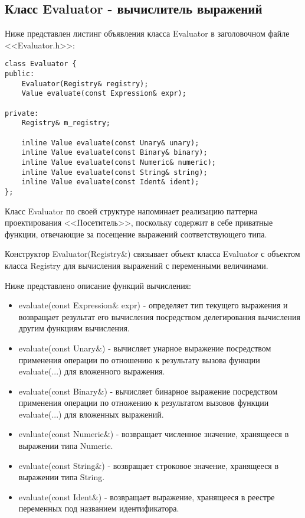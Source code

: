 \subsection{Класс Evaluator - вычислитель выражений}

Ниже представлен листинг объявления класса Evaluator
в заголовочном файле <<Evaluator.h>>:

\begin{verbatim}
class Evaluator {
public:
    Evaluator(Registry& registry);
    Value evaluate(const Expression& expr);

private:
    Registry& m_registry;

    inline Value evaluate(const Unary& unary);
    inline Value evaluate(const Binary& binary);
    inline Value evaluate(const Numeric& numeric);
    inline Value evaluate(const String& string);
    inline Value evaluate(const Ident& ident);
};      
\end{verbatim}

Класс Evaluator по своей структуре напоминает
реализацию паттерна проектирования <<Посетитель>>,
поскольку содержит в себе приватные функции,
отвечающие за посещение выражений соответствующего типа.

Конструктор Evaluator(Registry\&) связывает объект класса
Evaluator с объектом класса Registry для вычисления
выражений с переменными величинами.

Ниже представлено описание функций вычисления:
\begin{itemize}
    \item evaluate(const Expression\& expr) -
          определяет тип текущего выражения и возвращает
          результат его вычисления посредством делегирования
          вычисления другим функциям вычисления.

    \item evaluate(const Unary\&) -
          вычисляет унарное выражение посредством
          применения операции по отношению к результату
          вызова функции evaluate(...) для вложенного выражения.

    \item evaluate(const Binary\&) -
          вычисляет бинарное выражение посредством
          применения операции по отножению к результатом
          вызовов функции evaluate(...) для вложенных выражений.

    \item evaluate(const Numeric\&) -
          возвращает численное значение,
          хранящееся в выражении типа Numeric.
          
    \item evaluate(const String\&) -
          возвращает строковое значение,
          хранящееся в выражении типа String.

    \item evaluate(const Ident\&) - 
          возвращает выражение, хранящееся
          в реестре переменных под названием идентификатора.  
\end{itemize}

